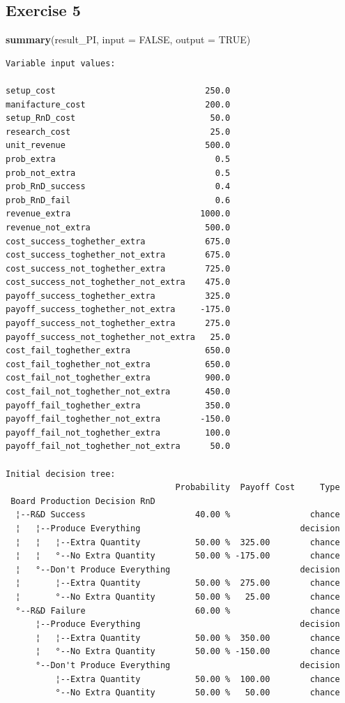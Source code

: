 \documentclass[]{article}
\newenvironment{Shaded}{\begin{snugshade}}{\end{snugshade}}
\newcommand{\KeywordTok}[1]{\textcolor[rgb]{0.13,0.29,0.53}{\textbf{#1}}}
\newcommand{\DataTypeTok}[1]{\textcolor[rgb]{0.13,0.29,0.53}{#1}}
\newcommand{\OtherTok}[1]{\textcolor[rgb]{0.56,0.35,0.01}{#1}}
\newcommand{\NormalTok}[1]{#1}
\begin{document}
\subsection{Exercise 5}\label{exercise-5}

\begin{Shaded}
\begin{Highlighting}[]
\KeywordTok{summary}\NormalTok{(result_PI, }\DataTypeTok{input =} \OtherTok{FALSE}\NormalTok{, }\DataTypeTok{output =} \OtherTok{TRUE}\NormalTok{)}
\end{Highlighting}
\end{Shaded}

\begin{verbatim}
Variable input values:
                                             
setup_cost                              250.0
manifacture_cost                        200.0
setup_RnD_cost                           50.0
research_cost                            25.0
unit_revenue                            500.0
prob_extra                                0.5
prob_not_extra                            0.5
prob_RnD_success                          0.4
prob_RnD_fail                             0.6
revenue_extra                          1000.0
revenue_not_extra                       500.0
cost_success_toghether_extra            675.0
cost_success_toghether_not_extra        675.0
cost_success_not_toghether_extra        725.0
cost_success_not_toghether_not_extra    475.0
payoff_success_toghether_extra          325.0
payoff_success_toghether_not_extra     -175.0
payoff_success_not_toghether_extra      275.0
payoff_success_not_toghether_not_extra   25.0
cost_fail_toghether_extra               650.0
cost_fail_toghether_not_extra           650.0
cost_fail_not_toghether_extra           900.0
cost_fail_not_toghether_not_extra       450.0
payoff_fail_toghether_extra             350.0
payoff_fail_toghether_not_extra        -150.0
payoff_fail_not_toghether_extra         100.0
payoff_fail_not_toghether_not_extra      50.0

Initial decision tree:
                                  Probability  Payoff Cost     Type
 Board Production Decision RnD                                     
  ¦--R&D Success                      40.00 %                chance
  ¦   ¦--Produce Everything                                decision
  ¦   ¦   ¦--Extra Quantity           50.00 %  325.00        chance
  ¦   ¦   °--No Extra Quantity        50.00 % -175.00        chance
  ¦   °--Don't Produce Everything                          decision
  ¦       ¦--Extra Quantity           50.00 %  275.00        chance
  ¦       °--No Extra Quantity        50.00 %   25.00        chance
  °--R&D Failure                      60.00 %                chance
      ¦--Produce Everything                                decision
      ¦   ¦--Extra Quantity           50.00 %  350.00        chance
      ¦   °--No Extra Quantity        50.00 % -150.00        chance
      °--Don't Produce Everything                          decision
          ¦--Extra Quantity           50.00 %  100.00        chance
          °--No Extra Quantity        50.00 %   50.00        chance


\end{verbatim}
\end{document}
